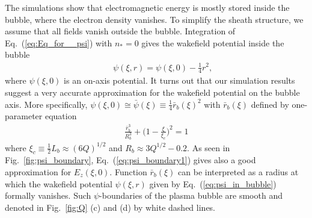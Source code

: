 \documentclass[twocolumn,showpacs,aip]{revtex4}
\begin{document}
The simulations show that electromagnetic energy is mostly stored inside  the bubble, %
where the electron density vanishes. To simplify the sheath structure, we assume that all fields vanish outside  the bubble. Integration of Eq.~(\ref{eq:Eq_for__psi}) with $n_*=0$ 
gives the wakefield potential inside  the bubble
\begin{eqnarray}
&&\psi(\xi,r)=\psi(\xi,0)-\frac{1}{4}r^2, 
\label{eq:psi_in_bubble}
\end{eqnarray}
 where $\psi(\xi,0)$ is an on-axis potential. It turns out that our  simulation results suggest a very accurate approximation for the wakefield potential on the bubble axis.  More specifically, 
%
$\psi(\xi,0)\cong \bar{\psi}(\xi)\equiv \frac{1}{4}\bar{r}_b(\xi)^2$ with
$\bar{r}_b(\xi)$  defined by  
 one-parameter equation 
\begin{eqnarray}
\frac{\bar{r}_b^3}{R_b^3}+{\bigg(1-\frac{\xi}{\xi_c}\bigg)^2}=1
\label{eq:psi_boundary1}
\end{eqnarray}
where $\xi_c\equiv\frac{1}{2}L_b\approx (6Q)^{1/2}$ 
and $R_b\approx 3Q^{1/2}-0.2$. As  seen in
 Fig.~\ref{fig:psi_boundary}, Eq.~(\ref{eq:psi_boundary1})  gives also a good approximation %
for $E_z(\xi,0)$. 
Function $\bar{r}_b(\xi)$ can be interpreted as a radius at which the wakefield potential $\psi(\xi,r)$ given by Eq.~(\ref{eq:psi_in_bubble}) formally vanishes. Such $\psi$-boundaries of the plasma bubble are smooth and denoted in Fig.~\ref{fig:Q} (c) and (d) by white dashed lines. 
\end{document}
